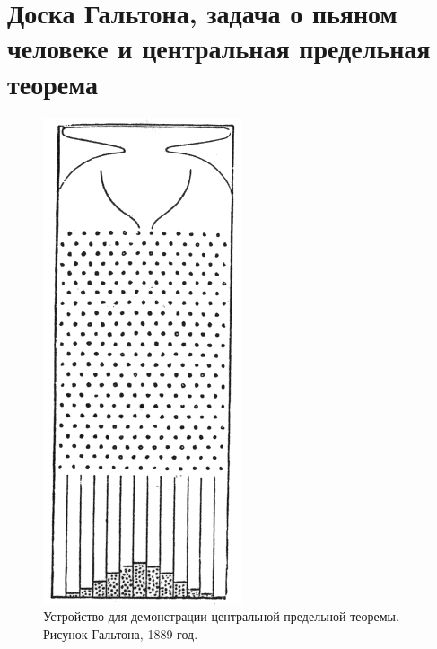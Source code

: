 \documentclass{book}
\begin{document}
\section{Доска Гальтона, задача о пьяном человеке и центральная предельная теорема}

\begin{figure}
    \includegraphics[width=0.7\linewidth]{Galton_board.png}
    \caption{\label{Galton_board}Устройство для демонстрации центральной предельной
    теоремы. Рисунок Гальтона, 1889 год.}
\end{figure}
\end{document}
